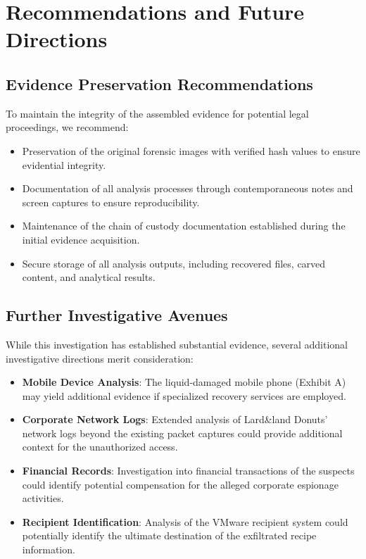 \section{Recommendations and Future Directions}

\subsection{Evidence Preservation Recommendations}
To maintain the integrity of the assembled evidence for potential legal proceedings, we recommend:

\begin{itemize}
    \item Preservation of the original forensic images with verified hash values to ensure evidential integrity.
    
    \item Documentation of all analysis processes through contemporaneous notes and screen captures to ensure reproducibility.
    
    \item Maintenance of the chain of custody documentation established during the initial evidence acquisition.
    
    \item Secure storage of all analysis outputs, including recovered files, carved content, and analytical results.
\end{itemize}

\subsection{Further Investigative Avenues}
While this investigation has established substantial evidence, several additional investigative directions merit consideration:

\begin{itemize}
    \item \textbf{Mobile Device Analysis}: The liquid-damaged mobile phone (Exhibit A) may yield additional evidence if specialized recovery services are employed.
    
    \item \textbf{Corporate Network Logs}: Extended analysis of Lard\&land Donuts' network logs beyond the existing packet captures could provide additional context for the unauthorized access.
    
    \item \textbf{Financial Records}: Investigation into financial transactions of the suspects could identify potential compensation for the alleged corporate espionage activities.
    
    \item \textbf{Recipient Identification}: Analysis of the VMware recipient system could potentially identify the ultimate destination of the exfiltrated recipe information.
\end{itemize}

